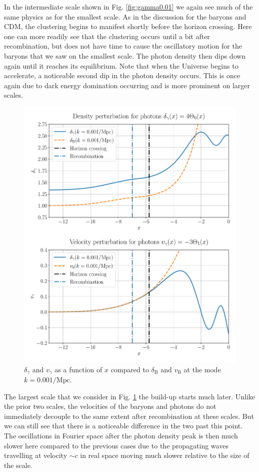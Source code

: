 \documentclass[%
reprint,
 amsmath,amssymb,
 aps,
]{revtex4-2}
\begin{document}
In the intermediate scale shown in Fig. \ref{fig:gamma0.01} we again see much of the same physics as for the smallest scale. As in the discussion for the baryons and CDM, the clustering begins to manifest shortly before the horizon crossing. Here one can more readily see that the clustering occurs until a bit after recombination, but does not have time to cause the oscillatory motion for the baryons that we saw on the smallest scale. The photon density then dips down again until it reaches its equilibrium. Note that when the Universe begins to accelerate, a noticeable second dip in the photon density occurs. This is once again due to dark energy domination occurring and is more prominent on larger scales.

\begin{figure}[ht!]
	\includegraphics[width = \linewidth]{Figures/gamma0.001.pdf}
	\caption{$\delta_\gamma$ and $v_\gamma$ as a function of $x$ compared to $\delta_\text{B}$ and $v_\text{B}$ at the mode $k=0.001/\text{Mpc}$.}
	\label{fig:gamma0.001}
\end{figure}

The largest scale that we consider in Fig. \ref{fig:gamma0.001} the build-up starts much later. Unlike the prior two scales, the velocities of the baryons and photons do not immediately decouple to the same extent after recombination at these scales. But we can still see that there is a noticeable difference in the two past this point. The oscillations in Fourier space after the photon density peak is then much slower here compared to the previous cases due to the propagating waves travelling at velocity $\sim c$ in real space moving much slower relative to the size of the scale.
\end{document}
